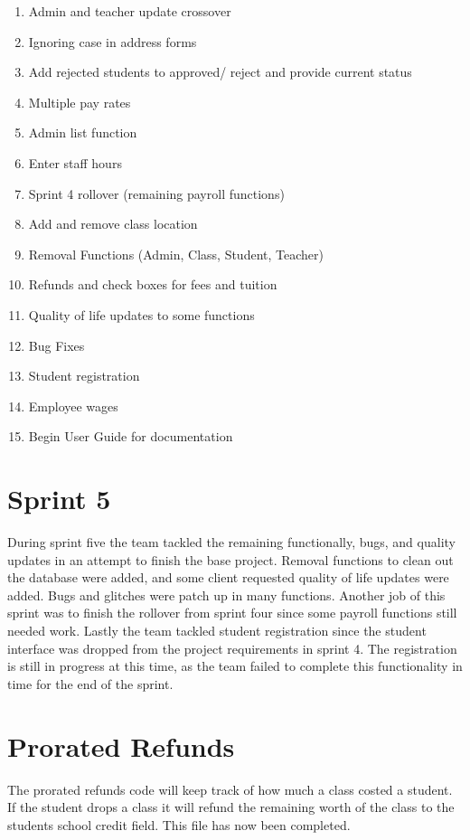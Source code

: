 \documentclass[11pt]{book}
\begin{document}
\begin{enumerate}
\item Admin and teacher update crossover
\item Ignoring case in address forms
\item Add rejected students to approved/ reject and provide current status
\item Multiple pay rates
\item Admin list function
\item Enter staff hours
\item Sprint 4 rollover (remaining payroll functions)
\item Add and remove class location
\item Removal Functions (Admin, Class, Student, Teacher)
\item Refunds and check boxes for fees and tuition
\item Quality of life updates to some functions
\item Bug Fixes
\item Student registration
\item Employee wages
\item Begin User Guide for documentation
\end{enumerate}


\section{Sprint 5}
During sprint five the team tackled the remaining functionally, bugs, and quality updates in an attempt to finish the base project. Removal functions to clean out the database were added, and some client requested quality of life updates were added. Bugs and glitches were patch up in many functions. Another job of this sprint was to finish the rollover from sprint four since some payroll functions still needed work. Lastly the team tackled student registration since the student interface was dropped from the project requirements in sprint 4. The registration is still in progress at this time, as the team failed to complete this functionality in time for the end of the sprint.

\section{Prorated Refunds}
The prorated refunds code will keep track of how much a class costed a student. If the student drops a class it will refund the remaining worth of the class to the students school credit field. This file has now been completed.
\end{document}
